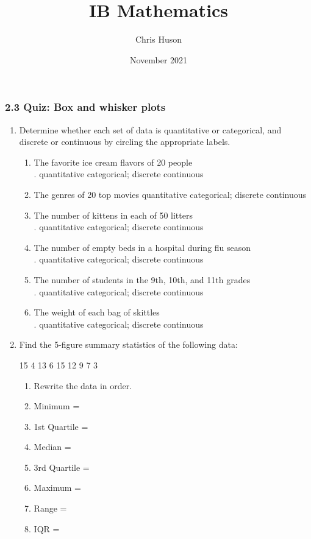 \documentclass[12pt, twoside]{article}
\title{IB Mathematics}
\author{Chris Huson}
\date{November 2021}
\begin{document}
\subsubsection*{2.3 Quiz: Box and whisker plots}
\begin{enumerate}
\item Determine whether each set of data is quantitative or categorical, and discrete or continuous by circling the appropriate labels.
  \begin{enumerate}[itemsep=0.5cm]
    \item The favorite ice cream flavors of 20 people\\. \hfill quantitative categorical; discrete continuous
    \item The genres of 20 top movies \hfill quantitative categorical; discrete continuous
    \item The number of kittens in each of 50 litters\\. \hfill quantitative categorical; discrete continuous
    \item The number of empty beds in a hospital during flu season\\. \hfill quantitative categorical; discrete continuous
    \item The number of students in the 9th, 10th, and 11th grades\\.  \hfill quantitative categorical; discrete continuous
    \item The weight of each bag of skittles\\. \hfill quantitative categorical; discrete continuous
  \end{enumerate} \vspace{0.5cm}

\item Find the 5-figure summary statistics of the following data:
  \begin{center}
  15 4 13 6 15 12 9 7 3
  \end{center}
  \begin{enumerate}[itemsep=0.7cm]
    \item Rewrite the data in order.
    \item Minimum =
    \item 1st Quartile =
    \item Median =
    \item 3rd Quartile =
    \item Maximum =
    \item Range =
    \item IQR =
  \end{enumerate} \vspace{0.5cm}


\end{enumerate}
\end{document}
